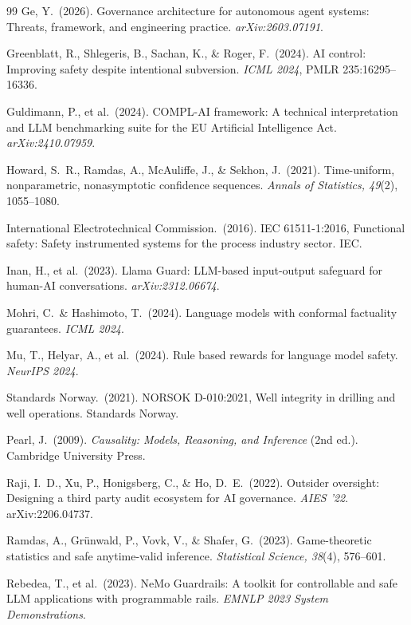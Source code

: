 \documentclass[10pt,twocolumn]{article}
\begin{document}
\begin{thebibliography}{99}
Ge, Y.\ (2026).
Governance architecture for autonomous agent systems: Threats, framework,
and engineering practice.
\emph{arXiv:2603.07191}.

Greenblatt, R., Shlegeris, B., Sachan, K., \& Roger, F.\ (2024).
AI control: Improving safety despite intentional subversion.
\emph{ICML 2024}, PMLR 235:16295--16336.

Guldimann, P., et al.\ (2024).
COMPL-AI framework: A technical interpretation and LLM benchmarking suite
for the EU Artificial Intelligence Act.
\emph{arXiv:2410.07959}.

Howard, S.~R., Ramdas, A., McAuliffe, J., \& Sekhon, J.\ (2021).
Time-uniform, nonparametric, nonasymptotic confidence sequences.
\emph{Annals of Statistics, 49}(2), 1055--1080.

International Electrotechnical Commission.\ (2016).
IEC 61511-1:2016, Functional safety: Safety instrumented systems for the
process industry sector.
IEC.

Inan, H., et al.\ (2023).
Llama Guard: LLM-based input-output safeguard for human-AI conversations.
\emph{arXiv:2312.06674}.

Mohri, C.\ \& Hashimoto, T.\ (2024).
Language models with conformal factuality guarantees.
\emph{ICML 2024}.

Mu, T., Helyar, A., et al.\ (2024).
Rule based rewards for language model safety.
\emph{NeurIPS 2024}.

Standards Norway.\ (2021).
NORSOK D-010:2021, Well integrity in drilling and well operations.
Standards Norway.

Pearl, J.\ (2009).
\emph{Causality: Models, Reasoning, and Inference} (2nd ed.).
Cambridge University Press.

Raji, I.~D., Xu, P., Honigsberg, C., \& Ho, D.~E.\ (2022).
Outsider oversight: Designing a third party audit ecosystem for AI
governance.
\emph{AIES '22}. arXiv:2206.04737.

Ramdas, A., Gr\"unwald, P., Vovk, V., \& Shafer, G.\ (2023).
Game-theoretic statistics and safe anytime-valid inference.
\emph{Statistical Science, 38}(4), 576--601.

Rebedea, T., et al.\ (2023).
NeMo Guardrails: A toolkit for controllable and safe LLM applications with
programmable rails.
\emph{EMNLP 2023 System Demonstrations}.


\end{thebibliography}
\end{document}
